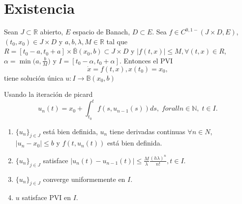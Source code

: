 \section{Existencia}

\begin{theo}[Picard]
  Sean $J \subset \mathbb{R}$ abierto, $E$ espacio de Banach, $D \subset E$. Sea $f \in C^{0,1-}( J \times D, E)$, $(t_{0}, x_{0}) \in J \times D$ y $a, b, \lambda, M \in \mathbb{R}$ tal que $R = [t_{0} - a, t_{0} + a] \times \overline{\mathbb{B}}(x_{0}, b) \subset J \times D$ y $| f(t,x) |\leq M, \forall (t,x) \in R$, $\alpha = \min\big ( a, \frac{b}{M} \big )$ y $I = [t_{0} - \alpha, t_{0} +\alpha]$. Entonces el PVI
  \[ 
    \dot{x} = f(t, x), x(t_{0}) = x_{0}, 
  \] 
  tiene solución única $u: I \to \mathbb{B}(x_{0}, b)$
\end{theo}

\begin{note}
  Usando la iteración de picard
  \[ 
    u_{n}(t) = x_{0} + \int_{t_{0}}^{t} f(s, u_{n-1}(s)) ds, \; forall n \in \mathbb{N}, \; t \in I.
  \] 
  \begin{enumerate}[label=(\roman*)]
    \item $\{ u_{n} \}_{j \in J}$ está bien definida, $u_{n}$ tiene derivadas continuas $\forall n \in N$, $| u_{n} - x_{0} | \leq b$ y $f(t, u_{n}(t))$ está bien definida.
    \item $\{ u_{n} \}_{j \in J}$ satisface $| u_{n}(t) - u_{n-1}(t) | \leq \frac{M}{\lambda}\frac{(h \lambda)^{n}}{n!}, t \in I$.
    \item $\{ u_{n} \}_{j \in J}$ converge uniformemente en $I$.
    \item $u$ satisface PVI en $I$.
  \end{enumerate}
\end{note}

